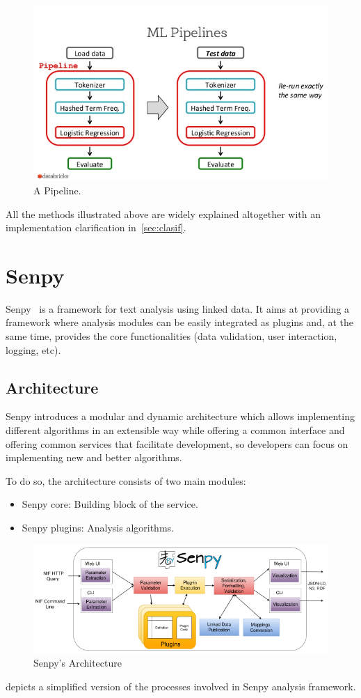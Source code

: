 \begin{figure}
	\includegraphics[width=\linewidth]{img/pipeline1.png}
	\caption{A Pipeline.~\cite{pipeline}}
	\label{fig:pipeline}
\end{figure}

All the methods illustrated above are widely explained altogether with an implementation clarification in~\cref{sec:clasif}.
\section{Senpy}
Senpy~\cite{senpy} is a framework for text analysis using linked data. It aims at providing a framework where analysis modules can be easily integrated as plugins and, at the same time, provides the core functionalities (data validation, user interaction, logging, etc).

\subsection{Architecture}
Senpy introduces a modular and dynamic architecture which allows implementing different algorithms in an extensible way while offering a common interface and offering common services that facilitate development, so developers can focus on implementing new and better algorithms.\par
To do so, the architecture consists of two main modules:
\begin{itemize}
	\item Senpy core: Building block of the service.
	\item Senpy plugins: Analysis algorithms.
\end{itemize}
\begin{figure}
	\includegraphics[width=\linewidth]{img/senpy_architecture.png}
	\caption{Senpy's Architecture~\cite{senpy}}
	\label{fig:senpyarch}
\end{figure}
 depicts a simplified version of the processes involved in Senpy analysis framework.


